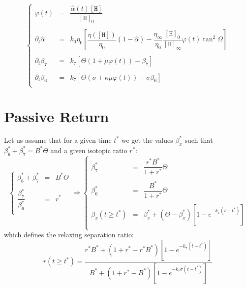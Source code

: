 \documentclass[aps,onecolumn,11pt]{revtex4}
\newcommand{\mychem}[1]{\mathtt{#1}}
\newcommand{\myconc}[1]{\left\lbrack{#1}\right\rbrack}
\newcommand{\spproton}{\mychem{H}}
\newcommand{\proton}{\myconc{\spproton}}
\newcommand{\start}{\ast}
\begin{document}
\begin{equation}
\left\lbrace
\begin{array}{rcl}
	 \varphi(t) & = & \dfrac{\hat\alpha(t) \proton}{\proton_0}\\
	 \\
	 \partial_t \hat\alpha & = &
	 k_0 \eta_0 \left[ \dfrac{\eta( \proton )}{\eta_0} \left(1-\hat\alpha\right) 
	 - \dfrac{\eta_\infty}{\eta_0} \dfrac{\proton_0}{\proton_\infty} \varphi(t) \tan^2\Omega\right]   \\
	 \\
	\partial_t \beta_7 & = & k_7 \left[ \Theta \left( 1 + \mu \varphi(t) \right) - \beta_7 \right] \\
	\\
	\partial_t \beta_6 & = & k_7 \left[ \Theta \left( \sigma + \kappa \mu \varphi(t) \right) - \sigma \beta_6 \right] \\
\end{array}
\right.
\end{equation}

\section{Passive Return}
Let us assume that for a given time $t^\start$ we get the values $\beta_x^\start$ such that $\beta_6^\start+\beta_7^\start=B^\start\Theta$ and a given isotopic ratio $r^\start$:
\begin{equation}
\label{eq:start}
\left\lbrace
\begin{array}{rcl}
\beta_6^\start+\beta_7^\start & = & B^\start\Theta \\
\\
\dfrac{\beta_7^\start}{\beta_6^\start} & = & r^\start\\
\end{array}
\right.
\Rightarrow
\left\lbrace
\begin{array}{rcl}
\beta_7^\start & = & \dfrac{r^\start B^\start}{1+r^\start}\Theta\\
\\
\beta_6^\start & = & \dfrac{B^\start}{1+r^\start}\Theta\\
\\
\beta_x(t\geq t^\start) & = & \beta_x^\start + \left(\Theta-\beta_x^\start\right)\left[1-e^{-k_x(t-t^\start)}\right]\\
\end{array}
\right.
\end{equation}
which defines the relaxing separation ratio:
\begin{equation}
	r(t\geq t^\start) = \dfrac
	{
		r^\start B^\start + ( 1+r^\start - r^\start B^\start) \left[1-e^{-k_7(t-t^\start)}\right]
	}
	{
		 B^\start + ( 1+r^\start -  B^\start) \left[1-e^{-k_7\sigma(t-t^\start)}\right]
	}
\end{equation}
\end{document}
